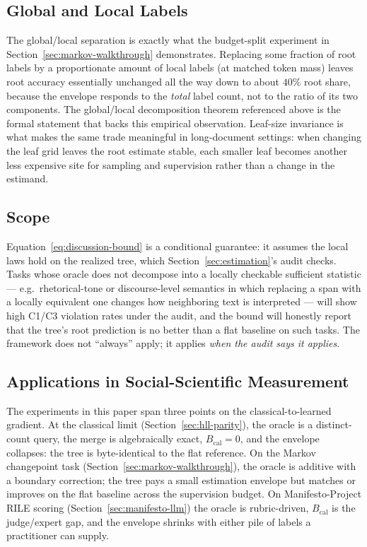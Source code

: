 \subsection{Global and Local Labels}

The global/local separation is exactly what the budget-split
experiment in Section~\ref{sec:markov-walkthrough} demonstrates.
Replacing some fraction of root labels by a proportionate amount of
local labels (at matched token mass) leaves root accuracy essentially
unchanged all the way down to about $40\%$ root share, because the
envelope responds to the \emph{total} label count, not to the ratio
of its two components. The global/local decomposition theorem referenced
above is the formal statement that backs this empirical observation.
Leaf-size invariance is what makes the same trade meaningful in
long-document settings: when changing the leaf grid leaves the root
estimate stable, each smaller leaf becomes another less expensive site
for sampling and supervision rather than a change in the estimand.

\subsection{Scope}

Equation~\eqref{eq:discussion-bound} is a conditional guarantee: it
assumes the local laws hold on the realized tree, which
Section~\ref{sec:estimation}'s audit checks. Tasks whose oracle does
not decompose into a locally checkable sufficient statistic --- e.g.\
rhetorical-tone or discourse-level semantics in which replacing a
span with a locally equivalent one changes how neighboring text is
interpreted --- will show high C1/C3 violation rates under the audit,
and the bound will honestly report that the tree's root prediction is
no better than a flat baseline on such tasks. The framework does not
``always'' apply; it applies \emph{when the audit says it applies}.

\subsection{Applications in Social-Scientific Measurement}

The experiments in this paper span three points on the classical-to-learned
gradient. At the classical limit (Section~\ref{sec:hll-parity}), the
oracle is a distinct-count query, the merge is algebraically exact,
$B_{\mathrm{cal}} = 0$, and the envelope collapses: the tree is
byte-identical to the flat reference. On the Markov changepoint task
(Section~\ref{sec:markov-walkthrough}), the oracle is additive with a
boundary correction; the tree pays a small estimation envelope but
matches or improves on the flat baseline across the supervision
budget. On Manifesto-Project RILE scoring (Section~\ref{sec:manifesto-llm})
the oracle is rubric-driven, $B_{\mathrm{cal}}$ is the judge/expert
gap, and the envelope shrinks with either pile of labels a
practitioner can supply.

